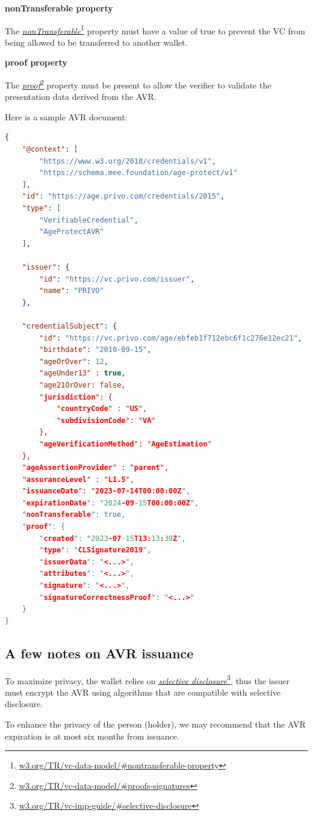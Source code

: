 \documentclass[11pt, oneside]{article}   	%
\newcommand{\hyperfootnote}[1][]{\def\ArgI{{#1}}\hyperfootnoteRelay}
\newcommand\hyperfootnoteRelay[2][]{\href{#1#2}{\ArgI}\footnote{\href{#1#2}{#2}}}
\begin{document}
\textbf{nonTransferable property}

The \hyperfootnote[\emph{nonTransferable}][https://]{w3.org/TR/vc-data-model/\#nontransferable-property} property must have a value of true to prevent the VC from being allowed to be transferred to another wallet.

\textbf{proof property}

The \hyperfootnote[\emph{proof}][https://]{w3.org/TR/vc-data-model/\#proofs-signatures} property must be present to allow the verifier to validate the presentation data derived from the AVR.

Here is a sample AVR document:

\begin{lstlisting}[language=json,firstnumber=1]
{
	"@context": [
		"https://www.w3.org/2018/credentials/v1",
		"https://schema.mee.foundation/age-protect/v1"
	],
	"id": "https://age.privo.com/credentials/2015",
	"type": [
		"VerifiableCredential",
		"AgeProtectAVR"
	],

	"issuer": {
		"id": "https://vc.privo.com/issuer",
		"name": "PRIVO"
	},

	"credentialSubject": {
		"id": "https://vc.privo.com/age/ebfeb1f712ebc6f1c276e12ec21",
		"birthdate": "2010-09-15",
		"ageOrOver": 12,
		"ageUnder13" : true,
		"age21OrOver: false,
		"jurisdiction": {
			"countryCode" : "US",
			"subdivisionCode": "VA"
		},
		"ageVerificationMethod": "AgeEstimation"
	},
	"ageAssertionProvider" : "parent",
	"assuranceLevel" : "L1.5",
	"issuanceDate": "2023-07-14T00:00:00Z",
	"expirationDate": "2024-09-15T00:00:00Z",
	"nonTransferable": true,
	"proof": {
		"created": "2023-07-15T13:13:39Z",
		"type": "CLSignature2019",
		"issuerData": "<...>",
		"attributes": "<...>",
		"signature": "<...>",
		"signatureCorrectnessProof": "<...>"
	}
}
\end{lstlisting}

\subsection{A few notes on AVR issuance}

To maximize privacy, the wallet relies on \hyperfootnote[\emph{selective disclosure}][https://]{w3.org/TR/vc-imp-guide/\#selective-disclosure}, thus the issuer must encrypt the AVR using algorithms that are compatible with selective disclosure.

To enhance the privacy of the person (holder), we may recommend that the AVR expiration is at most six months from issuance. 
\end{document}
